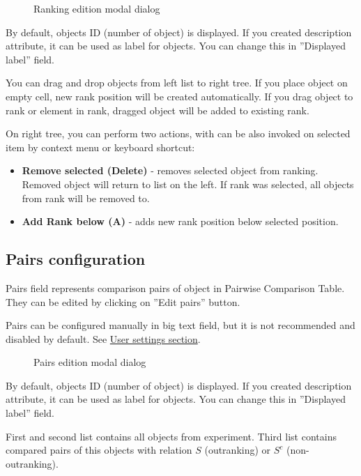 \begin{figure*}[!ht] 
	\centering
	\caption{Ranking edition modal dialog}
\end{figure*}

By default, objects ID (number of object) is displayed. If you created description attribute, it can be used as label for objects. You can change this in ''Displayed label'' field.

You can drag and drop objects from left list to right tree. If you place object on empty cell, new rank position will be created automatically. If you drag object to rank or element in rank, dragged object will be added to existing rank.

On right tree, you can perform two actions, with can be also invoked on selected item by context menu or keyboard shortcut:
\begin{itemize}
	\item \textbf{Remove selected (Delete)} - removes selected object from ranking. Removed object will return to list on the left. If rank was selected, all objects from rank will be removed to.
	\item \textbf{Add Rank below (A)} - adds new rank position below selected position.
\end{itemize}


\subsection{Pairs configuration}\label{sub:properties-pairs}

Pairs field represents comparison pairs of object in Pairwise Comparison Table. They can be edited by clicking on ''Edit pairs'' button.

Pairs can be configured manually in big text field, but it is not recommended and disabled by default. See \hyperref[section:user-settings]{User settings section}.

\begin{figure*}[!ht] 
	\centering
	\caption{Pairs edition modal dialog}
\end{figure*}

By default, objects ID (number of object) is displayed. If you created description attribute, it can be used as label for objects. You can change this in ''Displayed label'' field. 

First and second list contains all objects from experiment. Third list contains compared pairs of this objects with relation $S$ (outranking) or $S^{c}$ (non-outranking).

